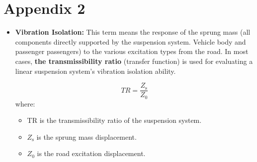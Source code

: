 \section{Appendix 2}
	\begin{itemize}
	
	\item \textbf{Vibration Isolation:} This term means the response of the sprung mass (all components directly supported by the suspension system. Vehicle body and passenger passengers) to the various excitation types from the road. In most cases, \textbf{the transmissibility ratio} (transfer function) is used for evaluating a linear suspension system's vibration isolation ability.
	
	\begin{equation}
		TR=\frac{Z_\text{s}}{Z_\text{0}}
	\end{equation}
	where:
	\begin{itemize}[label=\textbullet]
		\item TR is the transmissibility ratio of the suspension system.
		\item $Z_\text{s}$ is the sprung mass displacement.
		\item $Z_\text{0}$ is the road excitation displacement.
	\end{itemize}
	

\end{itemize}
